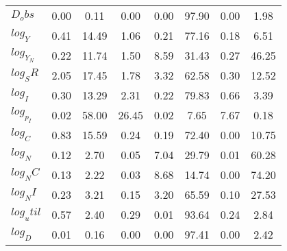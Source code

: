 \begin{center}
\begin{longtable}{lccccccc}
$D_obs     $	 & 	        0.00	 & 	        0.11	 & 	        0.00	 & 	        0.00	 & 	       97.90	 & 	        0.00	 & 	        1.98 \\ 
$log_Y     $	 & 	        0.41	 & 	       14.49	 & 	        1.06	 & 	        0.21	 & 	       77.16	 & 	        0.18	 & 	        6.51 \\ 
$log_Y_N   $	 & 	        0.22	 & 	       11.74	 & 	        1.50	 & 	        8.59	 & 	       31.43	 & 	        0.27	 & 	       46.25 \\ 
$log_SR    $	 & 	        2.05	 & 	       17.45	 & 	        1.78	 & 	        3.32	 & 	       62.58	 & 	        0.30	 & 	       12.52 \\ 
$log_I     $	 & 	        0.30	 & 	       13.29	 & 	        2.31	 & 	        0.22	 & 	       79.83	 & 	        0.66	 & 	        3.39 \\ 
$log_p_I   $	 & 	        0.02	 & 	       58.00	 & 	       26.45	 & 	        0.02	 & 	        7.65	 & 	        7.67	 & 	        0.18 \\ 
$log_C     $	 & 	        0.83	 & 	       15.59	 & 	        0.24	 & 	        0.19	 & 	       72.40	 & 	        0.00	 & 	       10.75 \\ 
$log_N     $	 & 	        0.12	 & 	        2.70	 & 	        0.05	 & 	        7.04	 & 	       29.79	 & 	        0.01	 & 	       60.28 \\ 
$log_NC    $	 & 	        0.13	 & 	        2.22	 & 	        0.03	 & 	        8.68	 & 	       14.74	 & 	        0.00	 & 	       74.20 \\ 
$log_NI    $	 & 	        0.23	 & 	        3.21	 & 	        0.15	 & 	        3.20	 & 	       65.59	 & 	        0.10	 & 	       27.53 \\ 
$log_util  $	 & 	        0.57	 & 	        2.40	 & 	        0.29	 & 	        0.01	 & 	       93.64	 & 	        0.24	 & 	        2.84 \\ 
$log_D     $	 & 	        0.01	 & 	        0.16	 & 	        0.00	 & 	        0.00	 & 	       97.41	 & 	        0.00	 & 	        2.42 \\ 
\end{longtable}
 \end{center}
